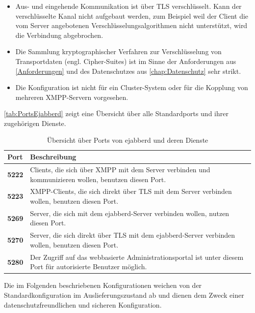 \documentclass[a4paper,titlepage,halfparskip,12pt]{scrreprt}
\begin{document}
\begin{onehalfspacing}
\begin{itemize}
\item Aus- und eingehende Kommunikation ist über \ac{TLS} verschlüsselt. Kann der verschlüsselte Kanal nicht aufgebaut werden, zum Beispiel weil der Client die vom Server angebotenen Verschlüsselungsalgorithmen nicht unterstützt, wird die Verbindung abgebrochen.

\item Die Sammlung kryptographischer Verfahren zur Verschlüsselung von Transportdaten (engl. Cipher-Suites) ist im Sinne der Anforderungen aus \autoref{Anforderungen} und des Datenschutzes aus \autoref{chap:Datenschutz} sehr strikt.

\item Die Konfiguration ist nicht für ein Cluster-System oder für die Kopplung von mehreren \ac{XMPP}-Servern vorgesehen.

\end{itemize}

\autoref{tab:PortsEjabberd} zeigt eine Übersicht über alle Standardports und ihrer zugehörigen Dienste.

\begin{table}[h]
\centering
\caption{Übersicht über Ports von ejabberd und deren Dienste}
\begin{tabular}{|l|p{}|}
\hline
\textbf{Port} & \textbf{Beschreibung} \\
\hline
\textbf{5222} & Clients, die sich über \ac{XMPP} mit dem Server verbinden und kommunizieren wollen, benutzen diesen Port. \\
\hline
\textbf{5223} & \ac{XMPP}-Clients, die sich direkt über \ac{TLS} mit dem Server verbinden wollen, benutzen diesen Port. \\
\hline
\textbf{5269} & Server, die sich mit dem ejabberd-Server verbinden wollen, nutzen diesen Port. \\
\hline
\textbf{5270} & Server, die sich direkt über \ac{TLS} mit dem ejabberd-Server verbinden wollen, benutzen diesen Port.  \\
\hline
\textbf{5280} & Der Zugriff auf das webbasierte Administrationsportal ist unter diesem Port für autorisierte Benutzer möglich. \\
\hline
\end{tabular}
\label{tab:PortsEjabberd}
\end{table}
Die im Folgenden beschriebenen Konfigurationen weichen von der Standardkonfiguration im Auslieferungszustand ab und dienen dem Zweck einer datenschutzfreundlichen und sicheren Konfiguration.


\end{onehalfspacing}
\end{document}

